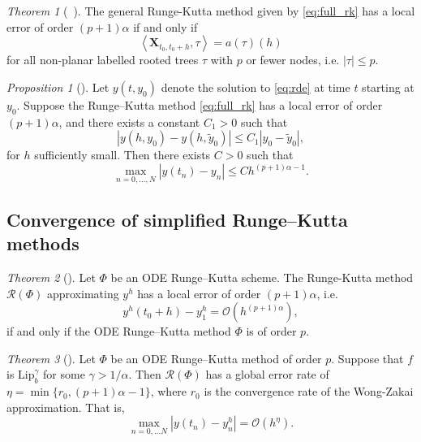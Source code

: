 \documentclass{article} %
\theoremstyle{definition}
\theoremstyle{remark}
\newtheorem{proposition}{Proposition}[section]
\newtheorem{theorem}{Theorem}[section]
\begin{document}
\begin{theorem}[{~\citep{redmann2020runge}}]
    The general Runge-Kutta method given by \eqref{eq:full_rk} has a local error of order $(p+1)\alpha$ if and only if
    \begin{equation*}
        \left< \mathbf{X}_{t_0, t_0 + h}, \tau \right> = a(\tau)(h)
    \end{equation*}
    for all non-planar labelled rooted trees $\tau$ with $p$ or fewer nodes, i.e. $|\tau| \leq p$.
\end{theorem}

\begin{proposition}[{\cite[Proposition 4.1]{redmann2020runge}}]
    Let $y(t, y_0)$ denote the solution to \eqref{eq:rde} at time $t$ starting at $y_0$. Suppose the Runge--Kutta method \eqref{eq:full_rk} has a local error of order $(p+1)\alpha$, and there exists a constant $C_1 > 0$ such that
    \begin{equation*}
        |y(h, y_0) - y(h, \widetilde{y}_0)| \leq C_1 |y_0 - \widetilde{y}_0|,
    \end{equation*}
    for $h$ sufficiently small. Then there exists $C > 0$ such that
    \begin{equation*}
        \max_{n = 0, \ldots, N} |y(t_n) - y_n| \leq Ch^{(p+1)\alpha - 1}.
    \end{equation*}
\end{proposition}

\subsection{Convergence of simplified Runge--Kutta methods}\label{appendix:convergence_simplified}

\begin{theorem}[{\cite[Theorem 3.3]{redmann2020runge}}]
    Let $\Phi$ be an ODE Runge--Kutta scheme. The Runge-Kutta method $\mathcal{R}(\Phi)$ approximating $y^h$ has a local error of order $(p+1)\alpha$, i.e.
    \begin{equation*}
        y^h(t_0 + h) - y_1^h = \mathcal{O}(h^{(p+1)\alpha}),
    \end{equation*}
    if and only if the ODE Runge--Kutta method $\Phi$ is of order $p$.
\end{theorem}

\begin{theorem}[{\cite[Theorem 4.2]{redmann2020runge}}]
    Let $\Phi$ be an ODE Runge--Kutta method of order $p$. Suppose that $f$ is $\text{Lip}^\gamma_b$ for some $\gamma > 1/\alpha$. Then $\mathcal{R}(\Phi)$ has a global error rate of $\eta = \min\{r_0, (p+1)\alpha - 1\}$, where $r_0$ is the convergence rate of the Wong-Zakai approximation. That is,
    \begin{equation*}
        \max_{n = 0, \ldots N} |y(t_n) - y^h_n| = \mathcal{O}(h^\eta).
    \end{equation*}
\end{theorem}
\end{document}
